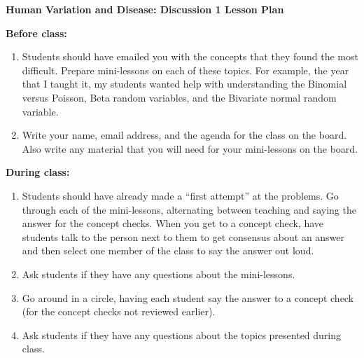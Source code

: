 \documentclass[12pt]{report}
\begin{document}
\begin{center}

\large{\textbf{Human Variation and Disease: Discussion 1 Lesson Plan}}

\end{center}

\textbf{Before class:}

\begin{enumerate}

\item Students should have emailed you with the concepts that they found the most difficult. Prepare mini-lessons on each of these topics. For example, the year that I taught it, my students wanted help with understanding the Binomial versus Poisson, Beta random variables, and the Bivariate normal random variable. 

\item Write your name, email address, and the agenda for the class on the board. Also write any material that you will need for your mini-lessons on the board. 

\end{enumerate}

\textbf{During class:}

\begin{enumerate}

\item Students should have already made a ``first attempt'' at the problems. Go through each of the mini-lessons, alternating between teaching and saying the answer for the concept checks. When you get to a concept check, have students talk to the person next to them to get consensus about an answer and then select one member of the class to say the answer out loud. 

\item Ask students if they have any questions about the mini-lessons. 

\item Go around in a circle, having each student say the answer to a concept check (for the concept checks not reviewed earlier).

\item Ask students if they have any questions about the topics presented during class. 


\end{enumerate}
\end{document}
